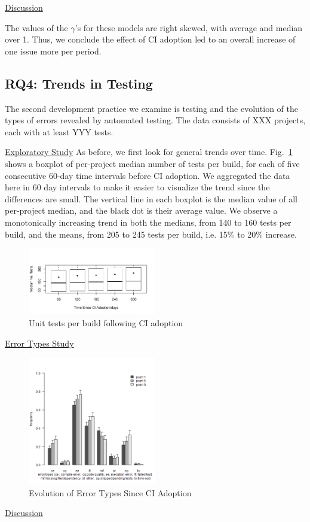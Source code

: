 \noindent \underline{Discussion}


The values of the $\gamma$'s for these models are right skewed, with average and median over 1. Thus, we conclude the effect of CI adoption led to an overall increase of one issue more per period.




\subsection{RQ4: Trends in Testing}

The second development practice we examine is testing and the evolution of the types of errors revealed by automated testing.
The data consists of XXX projects, each with at least YYY tests.

\noindent \underline{Exploratory Study} As before, we first look for general trends over time.
Fig.~\ref{Fig:Tests} shows a boxplot of per-project median number of tests per build, for each of five consecutive 60-day time intervals before CI adoption.
We aggregated the data here in 60 day intervals to make it easier to visualize the trend since the differences are small.
The vertical line in each boxplot is the median value of all per-project median, and the black dot is their average value.
We observe a monotonically increasing trend in both the medians, from 140 to 160 tests per build, and the means, from 205 to 245 tests per build, i.e. 15\% to 20\% increase. 

\begin{figure}[!t]
\centering
\includegraphics[width=0.5\textwidth]{tests.pdf}
\caption{Unit tests per build following CI adoption}
\label{Fig:Tests}
\end{figure}

\noindent \underline{Error Types Study}

\begin{figure}[!t]
\centering
\includegraphics[width=0.5\textwidth]{plot_together.png}
\caption{Evolution of Error Types Since CI Adoption}
\label{Fig:BugTypes}
\end{figure}

\noindent \underline{Discussion}


